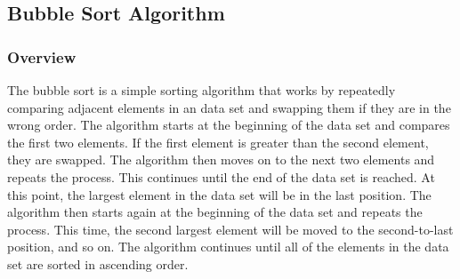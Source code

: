 \subsection*{Bubble Sort Algorithm}

\subsubsection*{Overview}

The bubble sort is a simple sorting algorithm that works by repeatedly comparing adjacent elements in an data set and swapping them if they are in the wrong order. The algorithm starts at the beginning of the data set and compares the first two elements. If the first element is greater than the second element, they are swapped. The algorithm then moves on to the next 
two elements and repeats the process. This continues until the end of the data set is reached. At this point, the largest element in the data set will be in the last position. The algorithm then starts again at the beginning of the data set and repeats the process. This time, the second largest element will be moved to the second-to-last position, and so on. The 
algorithm continues until all of the elements in the data set are sorted in ascending order.

